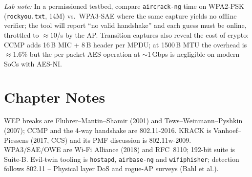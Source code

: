 \textit{Lab note:} In a permissioned testbed, compare \texttt{aircrack-ng} time on WPA2-PSK (\texttt{rockyou.txt}, 14M) vs.\ WPA3-SAE where the same capture yields no offline verifier; the tool will report ``no valid handshake'' and each guess must be online, throttled to $\approx10$/s by the AP.
Transition captures also reveal the cost of crypto: CCMP adds 16\,B MIC + 8\,B header per MPDU; at 1500\,B MTU the overhead is $\approx1.6\%$ but the per-packet AES operation at $\sim$1\,Gbps is negligible on modern SoCs with AES-NI.
\section*{Chapter Notes}
WEP breaks are Fluhrer--Mantin--Shamir (2001) and Tews--Weinmann--Pyshkin (2007); CCMP and the 4-way handshake are 802.11-2016. KRACK is Vanhoef--Piessens (2017, CCS) and its PMF discussion is 802.11w-2009. WPA3/SAE/OWE are Wi-Fi Alliance (2018) and RFC~8110; 192-bit suite is Suite-B. Evil-twin tooling is \texttt{hostapd}, \texttt{airbase-ng} and \texttt{wifiphisher}; detection follows 802.11 -- Physical layer DoS and rogue-AP surveys (Bahl et al.).

